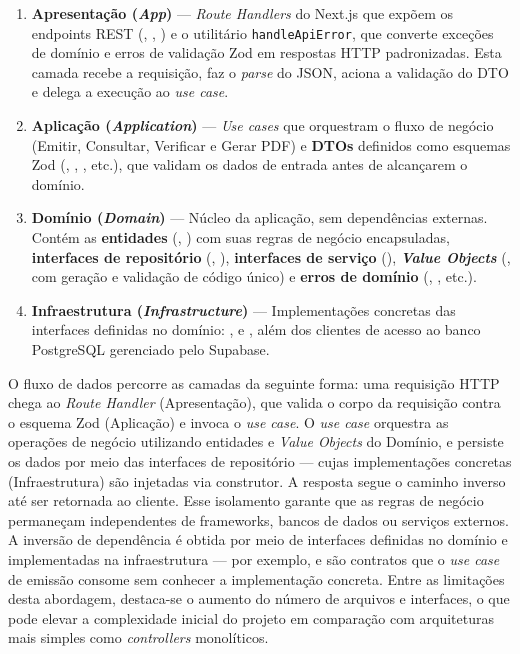 \begin{enumerate}
    \item \textbf{Apresentação (\textit{App})} --- \textit{Route Handlers} do Next.js que expõem os endpoints REST (, , ) e o utilitário \texttt{handle\-Api\-Error}, que converte exceções de domínio e erros de validação Zod em respostas HTTP padronizadas. Esta camada recebe a requisição, faz o \textit{parse} do JSON, aciona a validação do DTO e delega a execução ao \textit{use case}.
    \item \textbf{Aplicação (\textit{Application})} --- \textit{Use cases} que orquestram o fluxo de negócio (Emitir, Consultar, Verificar e Gerar PDF) e \textbf{DTOs} definidos como esquemas Zod (, , , etc.), que validam os dados de entrada antes de alcançarem o domínio.
    \item \textbf{Domínio (\textit{Domain})} --- Núcleo da aplicação, sem dependências externas. Contém as \textbf{entidades} (, ) com suas regras de negócio encapsuladas, \textbf{interfaces de repositório} (, ), \textbf{interfaces de serviço} (), \textbf{\textit{Value Objects}} (, com geração e validação de código único) e \textbf{erros de domínio} (, , etc.).
    \item \textbf{Infraestrutura (\textit{Infrastructure})} --- Implementações concretas das interfaces definidas no domínio: ,  e , além dos clientes de acesso ao banco PostgreSQL gerenciado pelo Supabase.
\end{enumerate}

O fluxo de dados percorre as camadas da seguinte forma: uma requisição HTTP chega ao \textit{Route Handler} (Apresentação), que valida o corpo da requisição contra o esquema Zod (Aplicação) e invoca o \textit{use case}. O \textit{use case} orquestra as operações de negócio utilizando entidades e \textit{Value Objects} do Domínio, e persiste os dados por meio das interfaces de repositório --- cujas implementações concretas (Infraestrutura) são injetadas via construtor. A resposta segue o caminho inverso até ser retornada ao cliente. Esse isolamento garante que as regras de negócio permaneçam independentes de frameworks, bancos de dados ou serviços externos. A inversão de dependência é obtida por meio de interfaces definidas no domínio e implementadas na infraestrutura --- por exemplo,  e  são contratos que o \textit{use case} de emissão consome sem conhecer a implementação concreta. Entre as limitações desta abordagem, destaca-se o aumento do número de arquivos e interfaces, o que pode elevar a complexidade inicial do projeto em comparação com arquiteturas mais simples como \textit{controllers} monolíticos.

